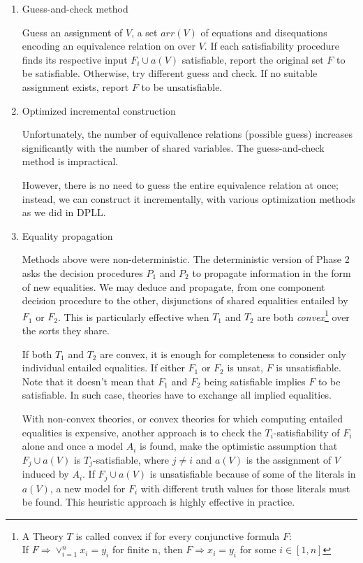 \documentclass[10pt,a4paper]{article}
\begin{document}
	\begin{enumerate}[label=\roman*)]
		\item Guess-and-check method 
		
		Guess an assignment of $ V $, a set $ arr(V) $ of equations and disequations encoding an equivalence relation on over $ V $. If each satisfiability procedure finds its respective input $ F_i \cup a(V) $ satisfiable, report the original set $ F $ to be satisfiable. Otherwise, try different guess and check. If no suitable assignment exists, report $ F $ to be unsatisfiable.
		
		\item Optimized incremental construction
		
		Unfortunately, the number of equivallence relations (possible guess) increases significantly with the number of shared variables. The guess-and-check method is impractical.
		
		However, there is no need to guess the entire equivalence relation at once; instead, we can construct it incrementally, with various optimization methods as we did in DPLL.
		
		\item Equality propagation
		
		Methods above were non-deterministic. The deterministic version of Phase 2 asks the decision procedures $ P_1 $ and $ P_2 $ to propagate information in the form of new equalities. We may deduce and propagate, from one component decision procedure to the other, disjunctions of shared equalities entailed by $ F_1 $ or $ F_2 $. This is particularly effective when $ T_1 $ and $ T_2 $ are both \textit{convex}\footnote{		A Theory $ T $ is called convex if for every conjunctive formula $ F $:\\
			If $ F \Rightarrow \vee^n_{i=1} x_i = y_i $ for finite n, then $ F \Rightarrow x_i = y_i $ for some $ i \in [1, n] $ } over the sorts they share.
		
		If both $ T_1 $ and $ T_2 $ are convex, it is enough for completeness to consider only individual entailed equalities. If either $ F_1 $ or $ F_2 $ is unsat, $ F $ is unsatisfiable. Note that it doesn't mean that $ F_1 $ and $ F_2 $ being satisfiable implies $ F $ to be satisfiable. In such case, theories have to exchange all implied equalities. 
	
		With non-convex theories, or convex theories for which computing entailed equalities is expensive, another approach is to check the $ T_i $-satisfiability of $ F_i $ alone and once a model $ A_i $ is found, make the optimistic assumption that $ F_j \cup a(V)$ is $ T_j $-satisfiable, where $ j \neq i $ and $ a(V) $ is the assignment of $ V $ induced by $ A_i $. If $ F_j \cup a(V) $ is unsatisfiable because of some of the literals in $ a(V) $, a new model for $ F_i $ with different truth values for those literals must be found. This heuristic approach is highly effective in practice.
		
		
	\end{enumerate}
	
\end{document}
